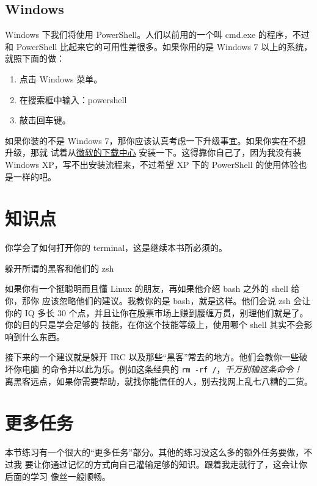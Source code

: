 \subsection{Windows}

Windows 下我们将使用 PowerShell。人们以前用的一个叫 cmd.exe 的程序，不过和 PowerShell
比起来它的可用性差很多。如果你用的是 Windows 7 以上的系统，就照下面的做：

\begin{enumerate}
\item 点击 Windows 菜单。
\item 在搜索框中输入：powershell
\item 敲击回车键。
\end{enumerate}

如果你装的不是 Windows 7，那你应该认真考虑一下升级事宜。如果你实在不想升级，那就
试着从\href{http://www.microsoft.com/download/en/details.aspx?displaylang=en&id=16818}{微软的下载中心}
安装一下。这得靠你自己了，因为我没有装 Windows XP，写不出安装流程来，不过希望 XP
下的 PowerShell 的使用体验也是一样的吧。

\section{知识点}

你学会了如何打开你的 terminal，这是继续本书所必须的。

\begin{aside}{躲开所谓的黑客和他们的 zsh}

如果你有一个挺聪明而且懂 Linux 的朋友，再如果他介绍 bash 之外的 shell 给你，那你
应该忽略他们的建议。我教你的是 bash，就是这样。他们会说 zsh 会让你的 IQ 多长 30
个点，并且让你在股票市场上赚到腰缠万贯，别理他们就是了。你的目的只是学会足够的
技能，在你这个技能等级上，使用哪个 shell 其实不会影响到什么东西。

接下来的一个建议就是躲开 IRC 以及那些“黑客”常去的地方。他们会教你一些破坏你电脑
的命令并以此为乐。例如这条经典的 \verb|rm -rf /|，\emph{千万别输这条命令！}
离黑客远点，如果你需要帮助，就找你能信任的人，别去找网上乱七八糟的二货。
\end{aside}

\section{更多任务}

本节练习有一个很大的“更多任务”部分。其他的练习没这么多的额外任务要做，不过我
要让你通过记忆的方式向自己灌输足够的知识。跟着我走就行了，这会让你后面的学习
像丝一般顺畅。

